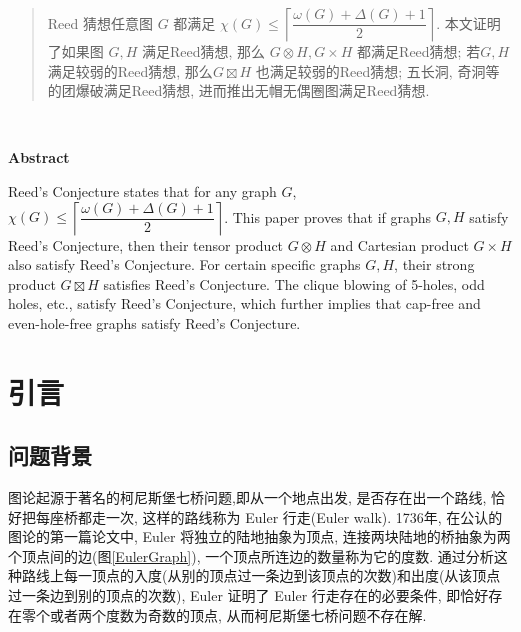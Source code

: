 \documentclass[12pt,a4paper]{article}%
\date{}%
\begin{document}
	
	\lhead{}%
	\chead{}%
	\rhead{}%
	\lfoot{}%
	\cfoot{\thepage}%
	\rfoot{}%

\newtheorem{Theorem}{定理}[section]
\newtheorem{thm}[Theorem]{定理}
\newtheorem{lemma}[Theorem]{引理}
\newtheorem*{pf}{证明：}
\newtheorem{ReedsConjecture}[Theorem]{\textbf{Reed 猜想}}
\newtheorem{Conjecture}[Theorem]{猜想}

\def\qed{\hfill \rule{4pt}{7pt}}


\begin{abstract}
    \fangsong Reed 猜想任意图 $G$ 都满足 $\chi(G) \leq \left\lceil \dfrac{\omega (G) + \Delta (G) + 1}{2}  \right\rceil$. 本文证明了如果图 $G,H$ 满足Reed猜想, 那么 $G \otimes H, G \times H$ 都满足Reed猜想; 若$G,H$ 满足较弱的Reed猜想, 那么$G \boxtimes H$ 也满足较弱的Reed猜想; 五长洞, 奇洞等的团爆破满足Reed猜想, 进而推出无帽无偶圈图满足Reed猜想.
\end{abstract}
	
\begin{adjustwidth}{1.06cm}{1.06cm}
	\fontsize{10.5pt}{15.75pt}\\
\end{adjustwidth}
	
\begin{center}%
		{\textbf{Abstract}}%
\end{center}
\begin{adjustwidth}{1.06cm}{1.06cm}%
	\hspace{1.5em}Reed's Conjecture states that for any graph $G$, $\chi(G) \leq \left\lceil \dfrac{\omega (G) + \Delta (G) + 1}{2} \right\rceil$. This paper proves that if graphs $G, H$ satisfy Reed's Conjecture, then their tensor product $G \otimes H$ and Cartesian product $G \times H$ also satisfy Reed's Conjecture. For certain specific graphs $G, H$, their strong product $G \boxtimes H$ satisfies Reed's Conjecture. The clique blowing of 5-holes, odd holes, etc., satisfy Reed's Conjecture, which further implies that cap-free and even-hole-free graphs satisfy Reed's Conjecture.
\end{adjustwidth}
\newpage%

\section{引言}

\subsection{问题背景}
图论起源于著名的柯尼斯堡七桥问题,即从一个地点出发, 是否存在出一个路线, 恰好把每座桥都走一次, 这样的路线称为 Euler 行走(Euler walk). 1736年, 在公认的图论的第一篇论文中, Euler\cite{euler1741} 将独立的陆地抽象为顶点, 连接两块陆地的桥抽象为两个顶点间的边(图\ref{EulerGraph}), 一个顶点所连边的数量称为它的度数. 通过分析这种路线上每一顶点的入度(从别的顶点过一条边到该顶点的次数)和出度(从该顶点过一条边到别的顶点的次数), Euler 证明了 Euler 行走存在的必要条件, 即恰好存在零个或者两个度数为奇数的顶点, 从而柯尼斯堡七桥问题不存在解.
\end{document}
